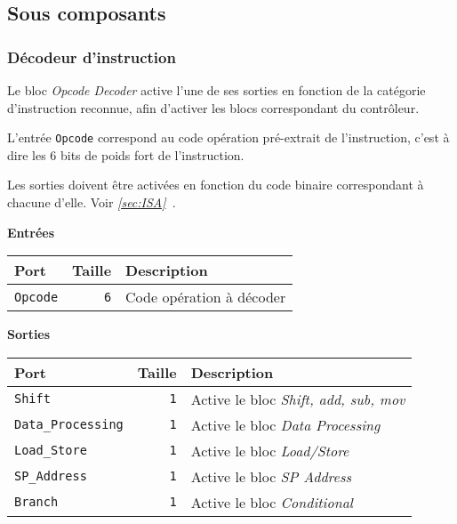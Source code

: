 \documentclass{article}
\begin{document}
\begin{tabular}{|l|r|l|}
        \hline
    \end{tabular}

    \subsection{Sous composants}

    \subsubsection{Décodeur d'instruction}
    \label{sec:OpDec}


    Le bloc \textit{Opcode Decoder} active l'une de ses sorties en fonction de la catégorie d'instruction reconnue, afin d'activer les blocs correspondant du contrôleur.

    L'entrée \texttt{Opcode} correspond au code opération pré-extrait de l'instruction, c'est à dire les 6 bits de poids fort de l'instruction.

    Les sorties doivent être activées en fonction du code binaire correspondant à chacune d'elle.
    Voir \textit{\ref{sec:ISA}~}.


    \textbf{Entrées}\\

    \begin{tabular}{|l|r|l|}
        \hline
        \textbf{Port}   & \textbf{Taille} & \textbf{Description}     \\
        \hline

        \texttt{Opcode} & \texttt{6}      & Code opération à décoder \\

        \hline
    \end{tabular}

    \vspace{1em}
    \textbf{Sorties}\\

    \begin{tabular}{|l|r|l|}
        \hline
        \textbf{Port}              & \textbf{Taille} & \textbf{Description}                         \\
        \hline

        \texttt{Shift}          & \texttt{1}      & Active le bloc \textit{Shift, add, sub, mov} \\
        \hline
        \texttt{Data\_Processing} & \texttt{1}      & Active le bloc \textit{Data Processing}      \\
        \hline
        \texttt{Load\_Store}     & \texttt{1}      & Active le bloc \textit{Load/Store}           \\
        \hline
        \texttt{SP\_Address}     & \texttt{1}      & Active le bloc \textit{SP Address}           \\
        \hline
        \texttt{Branch}         & \texttt{1}      & Active le bloc \textit{Conditional}          \\

        \hline
    \end{tabular}
\end{document}
